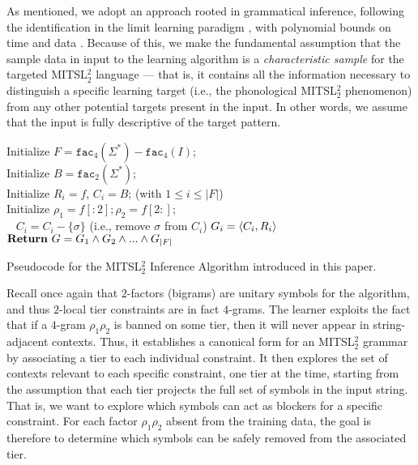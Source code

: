 \documentclass[11pt,a4paper]{article}
\newcommand{\facn}[1]{\ensuremath{\texttt{fac}_{#1}}}
\begin{document}
As mentioned, we adopt an approach rooted in grammatical inference, following the identification in the limit learning paradigm \cite{gold1967language}, with polynomial bounds on time and data \cite{de2010grammatical}.\@
Because of this, we make the fundamental assumption that the sample data in input to the learning algorithm is a \emph{characteristic sample} for the targeted MITSL$^2_2$  language --- that is, it contains all the information necessary to distinguish a specific learning target (i.e., the phonological MITSL$^2_2$ phenomenon) from any other potential targets present in the input.
In other words, we assume that the input is fully descriptive of the target pattern.
\begin{algorithm}[!ht]
    Initialize $F=\facn{4}(\Sigma^*)-\facn{4}(I)$; \\
    Initialize $B=\facn{2}(\Sigma^*)$; \\
        	{
            Initialize $R_i=f$, $C_i=B$; (with $1 \leq i \leq  |F|$) \\
             Initialize $\rho_1 = f[:2] ;\rho_2 = f[2:]$;\\
            	{
                	~
    					{$C_i=C_i-\{\sigma\}$ (i.e., remove $\sigma$ from $C_i$)}}
					$G_i=\langle{C_i,R_i}\rangle$
                }
            $\mathbf{Return}\textnormal{ }G=G_1\wedge G_2\wedge ... \wedge G_{|F|}$
            \medskip
	\caption{Pseudocode for the MITSL$^2_2$ Inference Algorithm introduced in this paper.}
\end{algorithm}
Recall once again that $2$-factors (bigrams) are unitary symbols for the algorithm, and thus $2$-local tier constraints are in fact $4$-grams.
The learner exploits the fact that if a $4$-gram $\rho_1\rho_2$ is banned on some tier, then it will never appear in string-adjacent contexts.
Thus, it establishes a canonical form for an MITSL$^2_2$ grammar by associating a tier to each individual constraint.
It then explores the set of contexts relevant to each specific constraint, one tier at the time, starting from the assumption that each tier projects the full set of symbols in the input string.
That is, we want to explore which symbols can act as blockers for a specific constraint.
 For each factor $\rho_1\rho_2$ absent from the training data, the goal is therefore to determine which symbols can be safely removed from the associated tier. 
\end{document}
